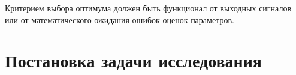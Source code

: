 Критерием выбора оптимума должен быть функционал от выходных
сигналов или от математического ожидания ошибок оценок параметров.

\section{Постановка задачи исследования}









